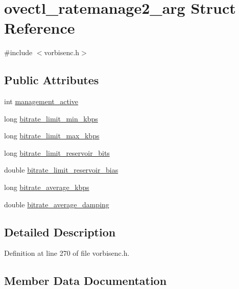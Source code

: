 \hypertarget{structovectl__ratemanage2__arg}{}\section{ovectl\+\_\+ratemanage2\+\_\+arg Struct Reference}
\label{structovectl__ratemanage2__arg}


{\ttfamily \#include $<$vorbisenc.\+h$>$}

\subsection*{Public Attributes}
\begin{DoxyCompactItemize}
\item 
int \mbox{\hyperlink{structovectl__ratemanage2__arg_aca1f656373a1597177dac924578e375b}{management\+\_\+active}}
\item 
long \mbox{\hyperlink{structovectl__ratemanage2__arg_aeb53a17fff14ec50d143602adfdeabeb}{bitrate\+\_\+limit\+\_\+min\+\_\+kbps}}
\item 
long \mbox{\hyperlink{structovectl__ratemanage2__arg_a175691482003edd7d94592fa2bc993a9}{bitrate\+\_\+limit\+\_\+max\+\_\+kbps}}
\item 
long \mbox{\hyperlink{structovectl__ratemanage2__arg_a75e496acac882e156137de9d1200ebd7}{bitrate\+\_\+limit\+\_\+reservoir\+\_\+bits}}
\item 
double \mbox{\hyperlink{structovectl__ratemanage2__arg_a5567fde1798b1e80e40a77565b4b44f4}{bitrate\+\_\+limit\+\_\+reservoir\+\_\+bias}}
\item 
long \mbox{\hyperlink{structovectl__ratemanage2__arg_a1f6bab60d87143d5060dd6c59aad6e71}{bitrate\+\_\+average\+\_\+kbps}}
\item 
double \mbox{\hyperlink{structovectl__ratemanage2__arg_a1069e148a884d8706928cd2e39870720}{bitrate\+\_\+average\+\_\+damping}}
\end{DoxyCompactItemize}


\subsection{Detailed Description}


Definition at line 270 of file vorbisenc.\+h.



\subsection{Member Data Documentation}
\mbox{\label{structovectl__ratemanage2__arg_a1069e148a884d8706928cd2e39870720}} 
